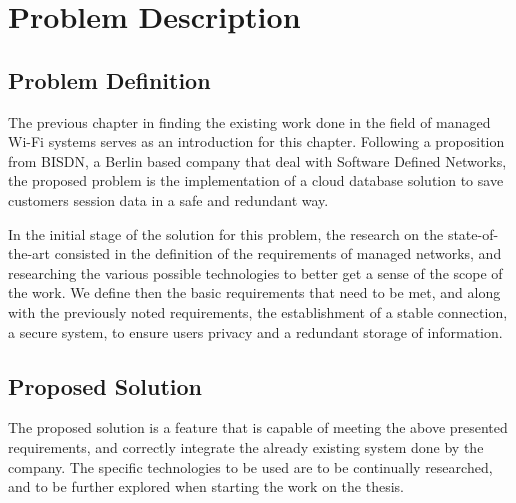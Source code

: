 \chapter{Problem Description} \label{chap:probdef}
\hspace{0.5cm}

\section {Problem Definition} %
\hspace{0.5cm}

The previous chapter in finding the existing work done in the field of managed Wi-Fi systems serves as an introduction for this chapter. Following a proposition from BISDN, a Berlin based company that deal with Software Defined Networks, the proposed problem is the implementation of a cloud database solution to save customers session data in a safe and redundant way. 

\par In the initial stage of the solution for this problem, the research on the state-of-the-art consisted in the definition of the requirements of managed networks, and researching the various possible technologies to better get a sense of the scope of the work. We define then the basic requirements that need to be met, and along with the previously noted requirements, the establishment of a stable connection, a secure system, to ensure users privacy and a redundant storage of information.


\section {Proposed Solution} %
\hspace{0.5cm}

The proposed solution is a feature that is capable of meeting the above presented requirements, and correctly integrate the already existing system done by the company. The specific technologies to be used are to be continually researched, and to be further explored when starting the work on the thesis.
